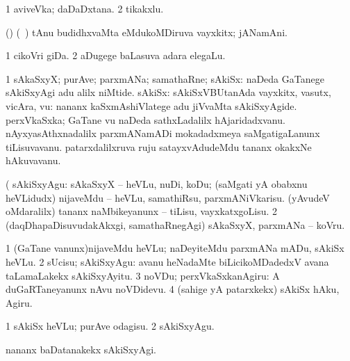 \bentry
{} 
\gl{\nA}
\expl{}
\bmng
\bnum
\num{1} aviveVka; daDaDxtana. 
\num{2} tikakxlu. 
\enum
\emng
\eentry

\bentry
{} 
\gl{\nA}
\expl{}
\bmng
(\pArxparx) (\sA\ \hiV) tAnu budidhxvaMta eMdukoMDiruva vayxkitx; jANamAni. 
\emng
\eentry

\bentry
{} 
\gl{\nA}
\expl{}
\bmng
\bnum
\num{1} cikoVri giDa. 
\num{2} aDugege baLasuva adara elegaLu. 
\enum
\emng
\eentry

\bentry
{} 
\gl{\nA}
\expl{}
\bmng
\bnum
\num{1} sAkaSxyX; purAve; parxmANa; samathaRne; sAkiSx:  naDeda GaTanege sAkiSxyAgi adu alilx niMtide. 
 sAkiSx: 
\banum
{} sAkiSxVBUtanAda vayxkitx, vasutx, vicAra, \mo vu:  nananx kaSxmAshiVlatege adu jiVvaMta sAkiSxyAgide. 
 perxVkaSxka; GaTane \mo vu naDeda sathxLadalilx hAjaridadxvanu. 
 nAyxyasAthxnadalilx parxmANamADi mokadadxmeya saMgatigaLanunx tiLisuvavanu. 
 patarxdalilxruva ruju satayxvAdudeMdu tananx okakxNe hAkuvavanu. 
\eanum
\numie
\enum
\emng

\noindent
\gl{\pagu}
\expl{}
\bmng
\bnum
{}  (  
\banum
{} sAkiSxyAgu: sAkaSxyX -- heVLu, nuDi, koDu; (saMgati yA obabxnu heVLidudx) nijaveMdu -- heVLu, samathiRsu, parxmANiVkarisu. 
 (yAvudeV oMdaralilx) tananx naMbikeyanunx -- tiLisu, vayxkatxgoLisu. 
\eanum
\numie
\num{2}  (daqDhapaDisuvudakAkxgi, samathaRnegAgi) sAkaSxyX, parxmANa -- koVru. 
\enum
\emng
\eentry

\bentry
{} 
\gl{\sakirx}
\expl{}
\bmng
\bnum
\num{1} (GaTane \mo vanunx)nijaveMdu heVLu; naDeyiteMdu parxmANa mADu, sAkiSx heVLu. 
\num{2} sUcisu; sAkiSxyAgu:  avanu heNadaMte biLicikoMDadedxV avana taLamaLakekx sAkiSxyAyitu. 
\num{3} noVDu; perxVkaSxkanAgiru:  A duGaRTaneyanunx nAvu noVDidevu. 
\num{4} (sahige yA patarxkekx) sAkiSx hAku, Agiru. 
\enum
\emng

\noindent
\gl{\akirx}
\expl{}
\bmng
\bnum
\num{1} sAkiSx heVLu; purAve odagisu. 
\num{2} sAkiSxyAgu.
\enum
\emng

\noindent 
\gl{\pagu}
\expl{}
\bmng
{}  nananx baDatanakekx sAkiSxyAgi. 
\emng
\eentry

